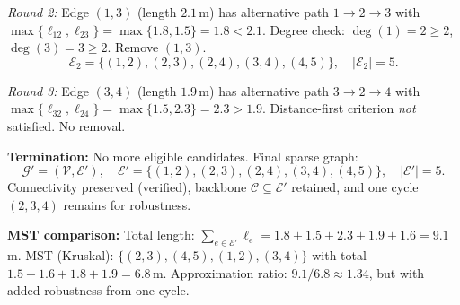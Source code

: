 \begin{example}[Numerical illustration with $N=5$ robots]
\emph{Round 2:} Edge $(1,3)$ (length $2.1$\,m) has alternative path $1\to 2\to 3$ with $\max\{\ell_{12},\ell_{23}\}=\max\{1.8,1.5\}=1.8<2.1$. Degree check: $\deg(1)=2\ge 2$, $\deg(3)=3\ge 2$. Remove $(1,3)$.
\[
\mathcal{E}_2 = \{(1,2), (2,3), (2,4), (3,4), (4,5)\}, \quad |\mathcal{E}_2|=5.
\]

\emph{Round 3:} Edge $(3,4)$ (length $1.9$\,m) has alternative path $3\to 2\to 4$ with $\max\{\ell_{32},\ell_{24}\}=\max\{1.5,2.3\}=2.3>1.9$. Distance-first criterion \emph{not} satisfied. No removal.

\noindent\textbf{Termination:} No more eligible candidates. Final sparse graph:
\[
\mathcal{G}'=(\mathcal{V},\mathcal{E}'), \quad \mathcal{E}'=\{(1,2), (2,3), (2,4), (3,4), (4,5)\}, \quad |\mathcal{E}'|=5.
\]
Connectivity preserved (verified), backbone $\mathcal{C}\subseteq\mathcal{E}'$ retained, and one cycle $(2,3,4)$ remains for robustness.

\noindent\textbf{MST comparison:}
Total length: $\sum_{e\in\mathcal{E}'}\ell_e=1.8+1.5+2.3+1.9+1.6=9.1$\,m.
MST (Kruskal): $\{(2,3), (4,5), (1,2), (3,4)\}$ with total $1.5+1.6+1.8+1.9=6.8$\,m.
Approximation ratio: $9.1/6.8\approx 1.34$, but with added robustness from one cycle.
\end{example}

